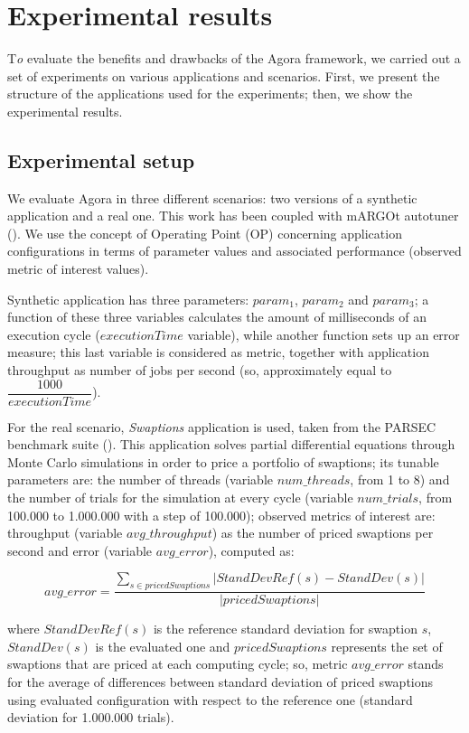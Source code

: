 \chapter{Experimental results}\label{exps}

\lettrine{T}{}\textit{o} evaluate the benefits and drawbacks of the Agora framework, we carried out a set of experiments on various applications and scenarios. First, we present the structure of the applications used for the experiments; then, we show the experimental results.

\section{Experimental setup}\label{expSetup}

We evaluate Agora in three different scenarios: two versions of a synthetic application and a real one. This work has been coupled with mARGOt autotuner (\cite{gadioli2015application}). We use the concept of Operating Point (OP) concerning application configurations in terms of parameter values and associated performance (observed metric of interest values).

Synthetic application has three parameters: $param_1$, $param_2$ and $param_3$; a function of these three variables calculates the amount of milliseconds of an execution cycle ($executionTime$ variable), while another function sets up an error measure; this last variable is considered as metric, together with application throughput as number of jobs per second (so, approximately equal to $\dfrac{1000}{executionTime}$).

For the real scenario, \textit{Swaptions} application is 	used, taken from the PARSEC benchmark suite (\cite{bienia2008parsec}). This application solves partial differential equations through Monte Carlo simulations in order to price a portfolio of swaptions; its tunable parameters are: the number of threads (variable $num\_threads$, from 1 to 8) and the number of trials for the simulation at every cycle (variable $num\_trials$, from 100.000 to 1.000.000 with a step of 100.000); observed metrics of interest are: throughput (variable $avg\_throughput$) as the number of priced swaptions per second and error (variable $avg\_error$), computed as:

\[
avg\_error = \dfrac{\sum_{s \in pricedSwaptions} \left\vert StandDevRef(s) - StandDev(s) \right\vert}{\left\vert pricedSwaptions \right\vert}
\]

where $StandDevRef(s)$ is the reference standard deviation for swaption $s$, $StandDev(s)$ is the evaluated one and $pricedSwaptions$ represents the set of swaptions that are priced at each computing cycle; so, metric $avg\_error$ stands for the average of differences between standard deviation of priced swaptions using evaluated configuration with respect to the reference one (standard deviation for 1.000.000 trials).

